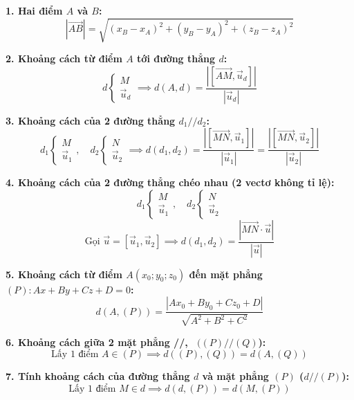 \documentclass[12pt,a4paper]{article}
\begin{document}
\begin{theorybox}
    \setlength{\lineskip}{4pt}
    
    \textbf{\textcolor{deepblue}{1. Hai điểm $A$ và $B$:}}
    \[
        |\vec{AB}| = \sqrt{(x_B - x_A)^2 + (y_B - y_A)^2 + (z_B - z_A)^2}
    \]

    \textbf{\textcolor{deepblue}{2. Khoảng cách từ điểm $A$ tới đường thẳng $d$:}}
    \[
        d \begin{cases} M \\ \vec{u}_d \end{cases} \implies d(A, d) = \frac{\left| [\vec{AM}, \vec{u}_d] \right|}{|\vec{u}_d|}
    \]

    \textbf{\textcolor{deepblue}{3. Khoảng cách của 2 đường thẳng $d_1 // d_2$:}}
    \[
        d_1 \begin{cases} M \\ \vec{u}_1 \end{cases}, \quad d_2 \begin{cases} N \\ \vec{u}_2 \end{cases} 
        \implies d(d_1, d_2) = \frac{\left| [\vec{MN}, \vec{u}_1] \right|}{|\vec{u}_1|} = \frac{\left| [\vec{MN}, \vec{u}_2] \right|}{|\vec{u}_2|}
    \]

    \textbf{\textcolor{deepblue}{4. Khoảng cách của 2 đường thẳng chéo nhau (2 vectơ không tỉ lệ):}}
    \[
        d_1 \begin{cases} M \\ \vec{u}_1 \end{cases}, \quad d_2 \begin{cases} N \\ \vec{u}_2 \end{cases}
    \]
    \[
        \text{Gọi } \vec{u} = [\vec{u}_1, \vec{u}_2] \implies d(d_1, d_2) = \frac{\left| \vec{MN} \cdot \vec{u} \right|}{|\vec{u}|}
    \]

    \textbf{\textcolor{deepblue}{5. Khoảng cách từ điểm $A(x_0; y_0; z_0)$ đến mặt phẳng $(P)\colon Ax + By + Cz + D = 0$:}}
    \[
        d(A, (P)) = \frac{|Ax_0 + By_0 + Cz_0 + D|}{\sqrt{A^2 + B^2 + C^2}}
    \]

    \textbf{\textcolor{deepblue}{6. Khoảng cách giữa 2 mặt phẳng //, \ $((P) // (Q)$):}}
    \[
        \text{Lấy 1 điểm } A \in (P) \implies d((P), (Q)) = d(A, (Q))
    \]

    \textbf{\textcolor{deepblue}{7. Tính khoảng cách của đường thẳng $d$ và mặt phẳng $(P)$ ($d // (P)$):}}
    \[
        \text{Lấy 1 điểm } M \in d \implies d(d, (P)) = d(M, (P))
    \]
\end{theorybox}
\end{document}
